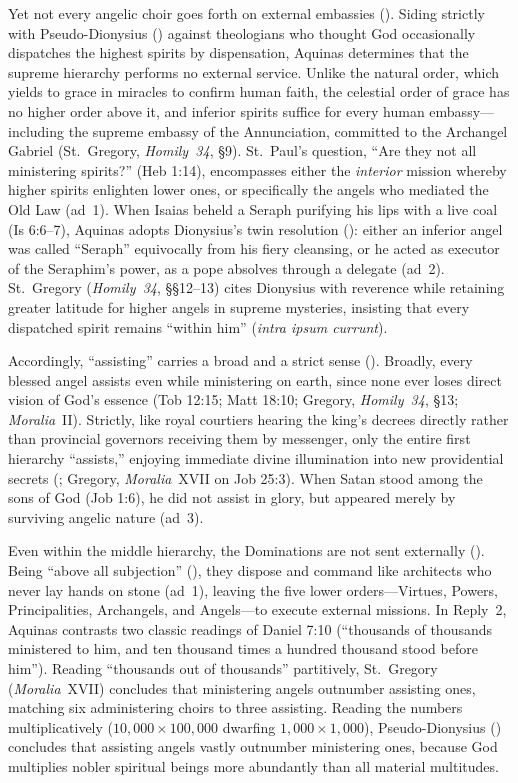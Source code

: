 Yet not every angelic choir goes forth on external embassies (). Siding strictly with Pseudo-Dionysius () against theologians who thought God occasionally dispatches the highest spirits by dispensation, Aquinas determines that the supreme hierarchy performs no external service. Unlike the natural order, which yields to grace in miracles to confirm human faith, the celestial order of grace has no higher order above it, and inferior spirits suffice for every human embassy---including the supreme embassy of the Annunciation, committed to the Archangel Gabriel (St.~Gregory, \emph{Homily~34}, \S9). St.~Paul's question, ``Are they not all ministering spirits?'' (Heb 1:14), encompasses either the \emph{interior} mission whereby higher spirits enlighten lower ones, or specifically the angels who mediated the Old Law (ad~1). When Isaias beheld a Seraph purifying his lips with a live coal (Is 6:6--7), Aquinas adopts Dionysius's twin resolution (): either an inferior angel was called ``Seraph'' equivocally from his fiery cleansing, or he acted as executor of the Seraphim's power, as a pope absolves through a delegate (ad~2). St.~Gregory (\emph{Homily~34}, \S\S12--13) cites Dionysius with reverence while retaining greater latitude for higher angels in supreme mysteries, insisting that every dispatched spirit remains ``within him'' (\emph{intra ipsum currunt}).

Accordingly, ``assisting'' carries a broad and a strict sense (). Broadly, every blessed angel assists even while ministering on earth, since none ever loses direct vision of God's essence (Tob 12:15; Matt 18:10; Gregory, \emph{Homily~34}, \S13; \emph{Moralia}~II). Strictly, like royal courtiers hearing the king's decrees directly rather than provincial governors receiving them by messenger, only the entire first hierarchy ``assists,'' enjoying immediate divine illumination into new providential secrets (; Gregory, \emph{Moralia}~XVII on Job 25:3). When Satan stood among the sons of God (Job 1:6), he did not assist in glory, but appeared merely by surviving angelic nature (ad~3).

Even within the middle hierarchy, the Dominations are not sent externally (). Being ``above all subjection'' (), they dispose and command like architects who never lay hands on stone (ad~1), leaving the five lower orders---Virtues, Powers, Principalities, Archangels, and Angels---to execute external missions. In Reply~2, Aquinas contrasts two classic readings of Daniel 7:10 (``thousands of thousands ministered to him, and ten thousand times a hundred thousand stood before him''). Reading ``thousands out of thousands'' partitively, St.~Gregory (\emph{Moralia}~XVII) concludes that ministering angels outnumber assisting ones, matching six administering choirs to three assisting. Reading the numbers multiplicatively ($10{,}000 \times 100{,}000$ dwarfing $1{,}000 \times 1{,}000$), Pseudo-Dionysius () concludes that assisting angels vastly outnumber ministering ones, because God multiplies nobler spiritual beings more abundantly than all material multitudes.

